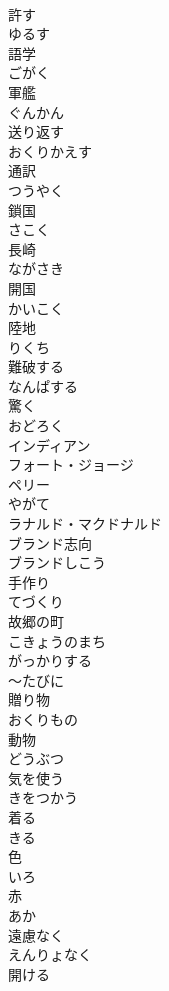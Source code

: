 \documentclass[8pt]{extreport}
\begin{document}
\begin{CJK}{UTF8}{min}
\\	許す	
\\	ゆるす
\\	語学	
\\	ごがく
\\	軍艦	
\\	ぐんかん
\\	送り返す	
\\	おくりかえす
\\	通訳	
\\	つうやく
\\	鎖国	
\\	さこく
\\	長崎	
\\	ながさき
\\	開国	
\\	かいこく
\\	陸地	
\\	りくち
\\	難破する	
\\	なんぱする
\\	驚く	
\\	おどろく
\\	インディアン	
\\	フォート・ジョージ	
\\	ペリー	
\\	やがて	
\\	ラナルド・マクドナルド	
\\	ブランド志向	
\\	ブランドしこう
\\	手作り	
\\	てづくり
\\	故郷の町	
\\	こきょうのまち
\\	がっかりする	
\\	～たびに	
\\	贈り物	
\\	おくりもの
\\	動物	
\\	どうぶつ
\\	気を使う	
\\	きをつかう
\\	着る	
\\	きる
\\	色	
\\	いろ
\\	赤	
\\	あか
\\	遠慮なく	
\\	えんりょなく
\\	開ける	

\end{CJK}
\end{document}
